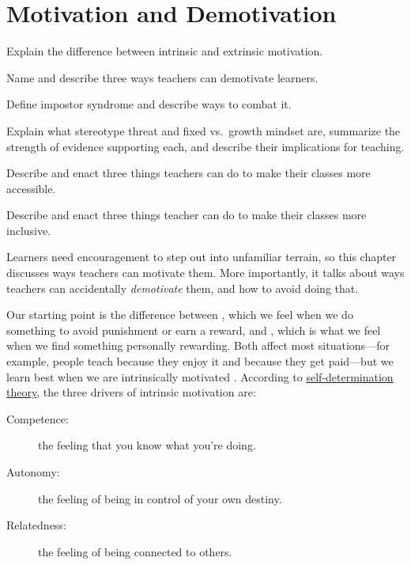 \chapter{Motivation and Demotivation}\label{s:motivation}

\begin{objectives}

\item
  Explain the difference between intrinsic and extrinsic motivation.
  
\item
  Name and describe three ways teachers can demotivate learners.

\item
  Define impostor syndrome and describe ways to combat it.

\item
  Explain what stereotype threat and fixed vs.\ growth mindset are,
  summarize the strength of evidence supporting each, and describe
  their implications for teaching.

\item
  Describe and enact three things teachers can do to make their
  classes more accessible.

\item
  Describe and enact three things teacher can do to make their classes
  more inclusive.

\end{objectives}

Learners need encouragement to step out into unfamiliar terrain, so
this chapter discusses ways teachers can motivate them.  More
importantly, it talks about ways teachers can accidentally
\emph{demotivate} them, and how to avoid doing that.

Our starting point is the difference between
, which we feel
when we do something to avoid punishment or earn a reward, and
, which is what
we feel when we find something personally rewarding.  Both affect most
situations---for example, people teach because they enjoy it and
because they get paid---but we learn best when we are intrinsically
motivated \cite{Wlod2017}.  According to
\href{https://en.wikipedia.org/wiki/Self-determination_theory}{self-determination
  theory}, the three drivers of intrinsic motivation are:

\begin{description}

\item[Competence:]
  the feeling that you know what you're doing.

\item[Autonomy:]
  the feeling of being in control of your own destiny.

\item[Relatedness:]
  the feeling of being connected to others.

\end{description}

